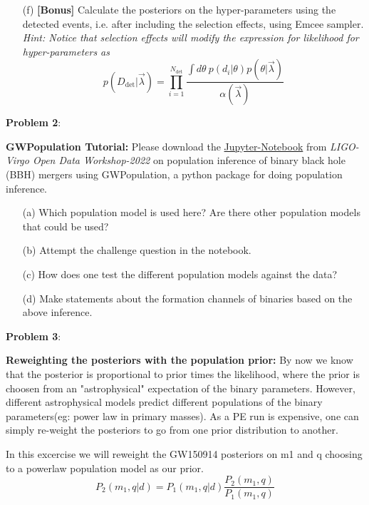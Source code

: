 \documentclass{article} %
\newcommand{\question}[2][]{\begin{flushleft}
        \textbf{Problem #1}: %
\end{flushleft}
}
\begin{document}
\begin{enumerate}
    \item[(f)] \textbf{[Bonus]} Calculate the posteriors on the hyper-parameters using the detected events, i.e. after including the selection effects, using Emcee sampler. \textit{Hint: Notice that selection effects will modify the expression for likelihood for hyper-parameters as}
    \begin{equation}
        p(D_{\mathrm{det}}|\Vec{\lambda}) =  \prod_{i=1}^{N_{\mathrm{det}}} \frac{\int d \theta \ p(d_i|\theta) p(\theta|\Vec{\lambda})}{\alpha(\Vec{\lambda})}
    \end{equation}

    \end{enumerate}

    \question[2]{} \textbf{GWPopulation Tutorial:} Please download the \href{https://github.com/gw-odw/odw-2022/blob/main/Tutorials/Advanced_topics/Tuto_A.2_Population_Inference_with_GWPopulation.ipynb}{Jupyter-Notebook} from \textit{LIGO-Virgo Open Data Workshop-2022} on population inference of binary black hole (BBH) mergers using GWPopulation, a python package for doing population inference.
    \begin{enumerate}
        \item[(a)] Which population model is used here? Are there other population models that could be used?
        \item[(b)] Attempt the challenge question in the notebook.
	\item[(c)] How does one test the different population models against the data? 
	\item[(d)] Make statements about the formation channels of binaries based on the above inference.

    \end{enumerate}
    
    
    \question[3]{} \textbf{Reweighting the posteriors with the population prior:} By now we know that the posterior is proportional to prior times the likelihood, where the prior is choosen from an "astrophysical" expectation of the binary parameters. However, different astrophysical models predict different populations of the binary parameters(eg: power law in primary masses). As a PE run is expensive, one can simply re-weight the posteriors to go from one prior distribution to another.
   
In this excercise we will reweight the GW150914 posteriors on m1 and q choosing to a powerlaw population model as our prior.
\begin{equation}
 	P_2(m_1,q|d) = P_1(m_1,q|d) \frac{P_2(m_1,q)}{P_1(m_1,q)}
\end{equation}
\end{document}
